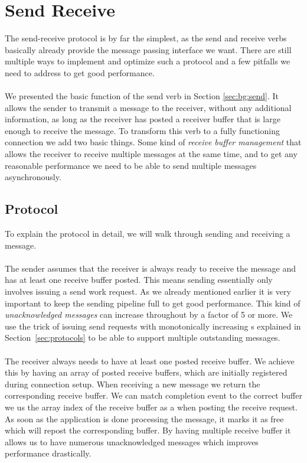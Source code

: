 \section{Send Receive} \label{sec:conn:send}\label{sendrcv}\label{sendrcv-design}

The send-receive protocol is by far the simplest, as the send and receive verbs basically already provide the 
message passing interface we want. There are still multiple ways to implement and optimize such a protocol and a few pitfalls 
we need to address to get good performance.

\paragraph{} We presented the basic function of the send verb in Section \ref{sec:bg:send}. It allows the sender to transmit 
a message to the receiver, without any additional information, as long as the receiver has posted a receiver buffer that is 
large enough to receive the message. To transform this verb to a fully functioning connection we add two basic things. 
Some kind of \emph{receive buffer management} that allows the receiver to receive multiple messages at the same time, 
and to get any reasonable performance we need to be able to send multiple messages asynchronously.

\subsection{Protocol} 
To explain the protocol in detail, we will walk through sending and receiving a message.

\paragraph{} The sender assumes that the receiver is always ready to receive the message and has at least one receive buffer 
posted. This means sending essentially only involves issuing a send work request. As we already mentioned earlier it is very 
important to keep the sending pipeline full to get good performance.  This kind of \emph{unacknowledged messages} can increase
throughout by a factor of 5 or more.
We use the trick of issuing send requests with monotonically increasing s explained in Section~\ref{sec:protocols}
to be able to support multiple 
outstanding messages.

\paragraph{} The receiver always needs to have at least one posted receive buffer. We achieve this by having an array of 
posted receive buffers, which are initially registered during connection setup. When receiving a new message we return 
the corresponding receive buffer. We can match completion event to the correct buffer we us the array index of the receive 
buffer as a  when posting the receive request. As soon as the application is done processing the message,
it marks it as free which will repost the corresponding buffer. By having multiple receive buffer it allows us to have 
numerous unacknowledged messages which improves performance drastically.

